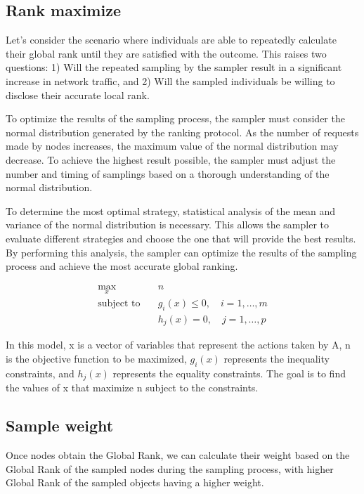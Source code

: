 \documentclass[twocolumn]{article}
\begin{document}
\subsection{Rank maximize}


Let's consider the scenario where individuals are able to repeatedly calculate their global rank until they are satisfied with the outcome. This raises two questions: 1) Will the repeated sampling by the sampler result in a significant increase in network traffic, and 2) Will the sampled individuals be willing to disclose their accurate local rank.

To optimize the results of the sampling process, the sampler must consider the normal distribution generated by the ranking protocol. As the number of requests made by nodes increases, the maximum value of the normal distribution may decrease. To achieve the highest result possible, the sampler must adjust the number and timing of samplings based on a thorough understanding of the normal distribution.

To determine the most optimal strategy, statistical analysis of the mean and variance of the normal distribution is necessary. This allows the sampler to evaluate different strategies and choose the one that will provide the best results. By performing this analysis, the sampler can optimize the results of the sampling process and achieve the most accurate global ranking.

\begin{align}
  \max_x \quad & n \\
  \text{subject to} \quad & g_i(x) \leq 0, \quad i = 1, \dots, m \\
  & h_j(x) = 0, \quad j = 1, \dots, p
\end{align}

In this model, x is a vector of variables that represent the actions taken by A, n is the objective function to be maximized, $g_i(x)$ represents the inequality constraints, and $h_j(x)$ represents the equality constraints. The goal is to find the values of x that maximize n subject to the constraints.


\subsection{Sample weight}
Once nodes obtain the Global Rank, we can calculate their weight based on the Global Rank of the sampled nodes during the sampling process, with higher Global Rank of the sampled objects having a higher weight.
\end{document}
